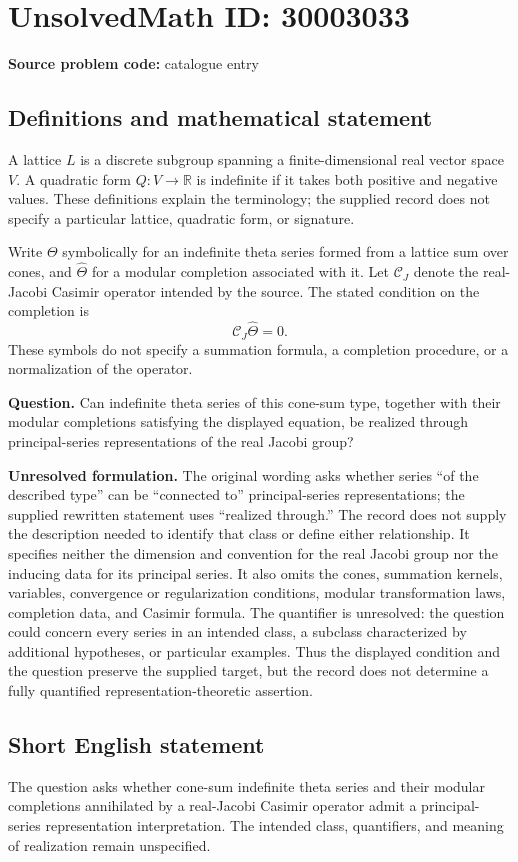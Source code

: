\documentclass[11pt]{article}
\newcommand{\R}{\mathbb{R}}
\begin{document}
\section*{UnsolvedMath ID: 30003033}
\textbf{Source problem code:} catalogue entry
\subsection{Definitions and mathematical statement}
A lattice \(L\) is a discrete subgroup spanning a finite-dimensional real vector space \(V\). A quadratic form \(Q\colon V\to\R\) is indefinite if it takes both positive and negative values. These definitions explain the terminology; the supplied record does not specify a particular lattice, quadratic form, or signature.

Write \(\Theta\) symbolically for an indefinite theta series formed from a lattice sum over cones, and \(\widehat\Theta\) for a modular completion associated with it. Let \(\mathcal C_J\) denote the real-Jacobi Casimir operator intended by the source. The stated condition on the completion is
\[
\mathcal C_J\widehat\Theta=0.
\]
These symbols do not specify a summation formula, a completion procedure, or a normalization of the operator.

\textbf{Question.} Can indefinite theta series of this cone-sum type, together with their modular completions satisfying the displayed equation, be realized through principal-series representations of the real Jacobi group?

\textbf{Unresolved formulation.} The original wording asks whether series ``of the described type'' can be ``connected to'' principal-series representations; the supplied rewritten statement uses ``realized through.'' The record does not supply the description needed to identify that class or define either relationship. It specifies neither the dimension and convention for the real Jacobi group nor the inducing data for its principal series. It also omits the cones, summation kernels, variables, convergence or regularization conditions, modular transformation laws, completion data, and Casimir formula. The quantifier is unresolved: the question could concern every series in an intended class, a subclass characterized by additional hypotheses, or particular examples. Thus the displayed condition and the question preserve the supplied target, but the record does not determine a fully quantified representation-theoretic assertion.
\subsection{Short English statement}
The question asks whether cone-sum indefinite theta series and their modular completions annihilated by a real-Jacobi Casimir operator admit a principal-series representation interpretation. The intended class, quantifiers, and meaning of realization remain unspecified.
\end{document}
